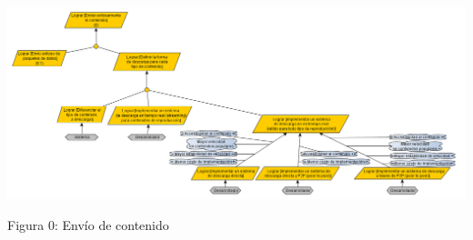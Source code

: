\documentclass[11pt, a4paper, spanish]{article}
\begin{document}
\newpage
	\begin{center}
		\includegraphics[scale=0.48, angle=90]{Diagramas/0ModelodeObjetivosLograrenviarcontenido.png}
	\end{center}
	\begin{center}
		\small{Figura 0: Env\'io de contenido}
	\end{center}
\end{document}
